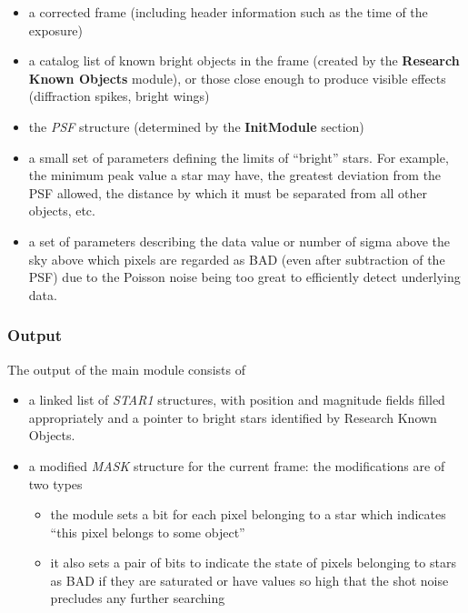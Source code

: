 \begin{itemize}
  \item a corrected frame (including header information such as the
        time of the exposure)
  \item a catalog list of known bright objects in the frame (created by the
        {\bf Research Known Objects} module), or those close enough
        to produce visible effects (diffraction spikes, bright wings)
  \item the {\it PSF} structure (determined by the {\bf InitModule}
        section)
  \item a small set of parameters defining the limits of ``bright''
        stars.  For example, the minimum peak value a star may have,
        the greatest deviation from the PSF allowed, the distance
        by which it must be separated from all other objects, etc.
  \item a set of parameters describing the data value or number of
        sigma above the sky above which pixels are regarded as BAD (even after
        subtraction of the PSF) due to the Poisson noise being too great to
        efficiently detect underlying data.
\end{itemize}

\subsubsection {Output}

  The output of the main \fbs module consists of

\begin{itemize}
  \item a linked list of {\it STAR1} structures, with position and
        magnitude fields filled appropriately and a pointer to bright
        stars identified by Research Known Objects. 
  \item a modified {\it MASK} structure for the current frame:
        the modifications are of two types
  \begin{itemize}
    \item the module sets a bit for each pixel belonging to a star
          which indicates ``this pixel belongs to some object''
    \item it also sets a pair of bits to indicate the state of
          pixels belonging to stars as BAD if they are saturated
          or have values so high that the shot noise precludes
          any further searching
  \end{itemize}
\end{itemize}

